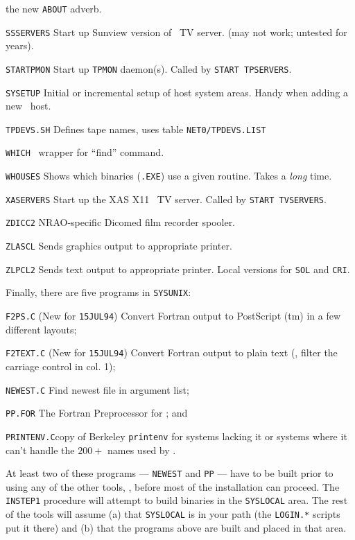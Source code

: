 {                         the new {\tt ABOUT} adverb.
\item{\tt SSSERVERS\quad} Start up Sunview version of \AIPS\ TV server.
                         (may not work; untested for years).
\item{\tt STARTPMON\quad} Start up {\tt TPMON} daemon(s).  Called by
                         {\tt START TPSERVERS}.
\item{\tt SYSETUP\quad}  Initial or incremental setup of host system
                         areas.  Handy when adding a new \AIPS\ host.
\item{\tt TPDEVS.SH\quad} Defines tape names,
                         uses table {\tt \dol NET0/TPDEVS.LIST}
\item{\tt WHICH\quad}    \AIPS\ wrapper for ``find'' command.
\item{\tt WHOUSES\quad}  Shows which binaries ({\tt *.EXE}) use a given
                         routine.  Takes a {\it long\/} time.
\item{\tt XASERVERS\quad} Start up the XAS X11 \AIPS\ TV server.  Called
                         by {\tt START TVSERVERS}.
\item{\tt ZDICC2\quad}   NRAO-specific Dicomed film recorder spooler.
\item{\tt ZLASCL\quad}   Sends graphics output to appropriate printer.
\item{\tt ZLPCL2\quad}   Sends text output to appropriate printer.
                         Local versions for {\tt SOL} and {\tt CRI}.
}\medskip

\noindent Finally, there are five programs in {\tt\dol SYSUNIX}:\medskip

{\parindent=3.7cm
\item{\tt F2PS.C\quad} (New for {\tt 15JUL94}) Convert Fortran output to
                PostScript (tm) in a few different layouts;
\item{\tt F2TEXT.C\quad} (New for {\tt 15JUL94}) Convert Fortran output to
                plain text (\ie, filter the carriage control in col. 1);
\item{\tt NEWEST.C\quad} Find newest file in argument list;
\item{\tt PP.FOR\quad} The Fortran Preprocessor for \aips; and
\item{\tt PRINTENV.C\quad}{copy of Berkeley {\tt printenv} for systems
                lacking it or systems where it can't handle the {$200+$}
                names used by \AIPS.\medskip}\medskip
}
\medskip\noindent
At least two of these programs --- {\tt NEWEST} and {\tt PP} --- have to
be built prior to using any of the other tools, \ie, before most of the
installation can proceed.  The {\tt INSTEP1} procedure will attempt to
build binaries in the {\tt \dol SYSLOCAL} area.  The rest of the tools
will assume (a) that {\tt\dol SYSLOCAL} is in your path (the {\tt LOGIN.*}
scripts put it there) and (b) that the programs above are built and placed
in that area.\medskip

